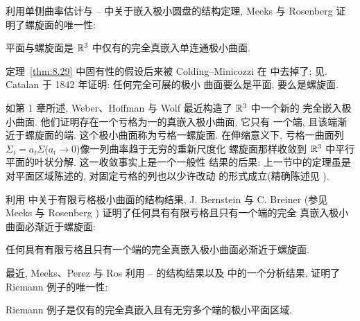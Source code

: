 
利用单侧曲率估计与 \cite{CM3}--\cite{CM6} 中关于嵌入极小圆盘的结构定理,
Meeks 与 Rosenberg \cite{MeR2} 证明了螺旋面的唯一性:

\begin{theorem}
\label{thm:8.29}
平面与螺旋面是 $\mathbb{R}^3$ 中仅有的完全真嵌入单连通极小曲面.
\end{theorem}

定理~\ref{thm:8.29} 中固有性的假设后来被 Colding--Minicozzi 在
\cite{CM24} 中去掉了; 见. Catalan 于 1842 年证明: 任何完全可展的极小
曲面要么是平面, 要么是螺旋面.

如第 1 章所述, Weber、Hoffman 与 Wolf \cite{HoWW} 最近构造了 $\mathbb{R}^3$ 中一个新的
完全嵌入极小曲面. 他们证明存在一个亏格为一的真嵌入极小曲面, 它只有
一个端, 且该端渐近于螺旋面的端. 这个极小曲面称为亏格一螺旋面. 在伸缩意义下,
亏格一曲面列 $\Sigma_i=a_i\Sigma$($a_i\to0$)像一列曲率趋于无穷的重新尺度化
螺旋面那样收敛到 $\mathbb{R}^3$ 中平行平面的叶状分解. 这一收敛事实上是一个一般性
结果的后果: 上一节中的定理虽是对平面区域陈述的, 对固定亏格的列也以少许改动
的形式成立(精确陈述见 \cite{CM7}).

利用 \cite{CM7} 中关于有限亏格极小曲面的结构结果, J. Bernstein 与 C. Breiner
(参见 Meeks 与 Rosenberg \cite{MeR2}) 证明了任何具有有限亏格且只有一个端的完全
真嵌入极小曲面必渐近于螺旋面:

\begin{theorem}
\label{thm:8.30}
任何具有有限亏格且只有一个端的完全真嵌入极小曲面必渐近于螺旋面.
\end{theorem}


最近, Meeks、Perez 与 Ros 利用 \cite{CM3}--\cite{CM7} 的结构结果以及
\cite{CDM} 中的一个分析结果, 证明了 Riemann 例子的唯一性:

\begin{theorem}
\label{thm:8.31}
Riemann 例子是仅有的完全真嵌入且有无穷多个端的极小平面区域.
\end{theorem}
